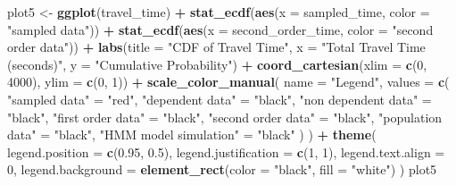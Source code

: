 \documentclass[
]{article}
\newenvironment{Shaded}{\begin{snugshade}}{\end{snugshade}}
\newcommand{\AttributeTok}[1]{\textcolor[rgb]{0.13,0.29,0.53}{#1}}
\newcommand{\DecValTok}[1]{\textcolor[rgb]{0.00,0.00,0.81}{#1}}
\newcommand{\FloatTok}[1]{\textcolor[rgb]{0.00,0.00,0.81}{#1}}
\newcommand{\FunctionTok}[1]{\textcolor[rgb]{0.13,0.29,0.53}{\textbf{#1}}}
\newcommand{\NormalTok}[1]{#1}
\newcommand{\OtherTok}[1]{\textcolor[rgb]{0.56,0.35,0.01}{#1}}
\newcommand{\SpecialCharTok}[1]{\textcolor[rgb]{0.81,0.36,0.00}{\textbf{#1}}}
\newcommand{\StringTok}[1]{\textcolor[rgb]{0.31,0.60,0.02}{#1}}
\begin{document}
\begin{Shaded}
\begin{Highlighting}[]
\NormalTok{plot5 }\OtherTok{\textless{}{-}} \FunctionTok{ggplot}\NormalTok{(travel\_time) }\SpecialCharTok{+}
  \FunctionTok{stat\_ecdf}\NormalTok{(}\FunctionTok{aes}\NormalTok{(}\AttributeTok{x =}\NormalTok{ sampled\_time, }\AttributeTok{color =} \StringTok{"sampled data"}\NormalTok{)) }\SpecialCharTok{+}
  \FunctionTok{stat\_ecdf}\NormalTok{(}\FunctionTok{aes}\NormalTok{(}\AttributeTok{x =}\NormalTok{ second\_order\_time, }\AttributeTok{color =} \StringTok{"second order data"}\NormalTok{)) }\SpecialCharTok{+}
  \FunctionTok{labs}\NormalTok{(}\AttributeTok{title =} \StringTok{"CDF of Travel Time"}\NormalTok{, }\AttributeTok{x =} \StringTok{"Total Travel Time (seconds)"}\NormalTok{, }\AttributeTok{y =} \StringTok{"Cumulative Probability"}\NormalTok{) }\SpecialCharTok{+}
  \FunctionTok{coord\_cartesian}\NormalTok{(}\AttributeTok{xlim =} \FunctionTok{c}\NormalTok{(}\DecValTok{0}\NormalTok{, }\DecValTok{4000}\NormalTok{), }\AttributeTok{ylim =} \FunctionTok{c}\NormalTok{(}\DecValTok{0}\NormalTok{, }\DecValTok{1}\NormalTok{)) }\SpecialCharTok{+}
  \FunctionTok{scale\_color\_manual}\NormalTok{(}
    \AttributeTok{name =} \StringTok{"Legend"}\NormalTok{,}
    \AttributeTok{values =} \FunctionTok{c}\NormalTok{(}
      \StringTok{"sampled data"} \OtherTok{=} \StringTok{"red"}\NormalTok{,}
      \StringTok{"dependent data"} \OtherTok{=} \StringTok{"black"}\NormalTok{,}
      \StringTok{"non dependent data"} \OtherTok{=} \StringTok{"black"}\NormalTok{,}
      \StringTok{"first order data"} \OtherTok{=} \StringTok{"black"}\NormalTok{,}
      \StringTok{"second order data"} \OtherTok{=} \StringTok{"black"}\NormalTok{,}
      \StringTok{"population data"} \OtherTok{=} \StringTok{"black"}\NormalTok{,}
      \StringTok{"HMM model simulation"} \OtherTok{=} \StringTok{"black"}
\NormalTok{    )}
\NormalTok{  ) }\SpecialCharTok{+}
  \FunctionTok{theme}\NormalTok{(}
    \AttributeTok{legend.position =} \FunctionTok{c}\NormalTok{(}\FloatTok{0.95}\NormalTok{, }\FloatTok{0.5}\NormalTok{),}
    \AttributeTok{legend.justification =} \FunctionTok{c}\NormalTok{(}\DecValTok{1}\NormalTok{, }\DecValTok{1}\NormalTok{),}
    \AttributeTok{legend.text.align =} \DecValTok{0}\NormalTok{,}
    \AttributeTok{legend.background =} \FunctionTok{element\_rect}\NormalTok{(}\AttributeTok{color =} \StringTok{"black"}\NormalTok{, }\AttributeTok{fill =} \StringTok{"white"}\NormalTok{)}
\NormalTok{  )}
\NormalTok{plot5}
\end{Highlighting}
\end{Shaded}
\end{document}
